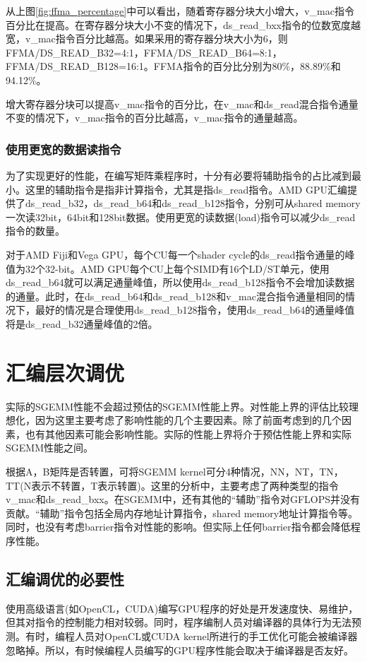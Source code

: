 从上图\ref{fig:ffma_percentage}中可以看出，随着寄存器分块大小增大，v\_mac指令百分比在提高。在寄存器分块大小不变的情况下，ds\_read\_bxx指令的位数宽度越宽，v\_mac指令百分比越高。如果采用的寄存器分块大小为6，则FFMA/DS\_READ\_B32=4:1，FFMA/DS\_READ\_B64=8:1，FFMA/DS\_READ\_B128=16:1。FFMA指令的百分比分别为80\%，88.89\%和94.12\%。

增大寄存器分块可以提高v\_mac指令的百分比，在v\_mac和ds\_read混合指令通量不变的情况下，v\_mac指令的百分比越高，v\_mac指令的通量越高。

\subsubsection{使用更宽的数据读指令}
为了实现更好的性能，在编写矩阵乘程序时，十分有必要将辅助指令的占比减到最小。这里的辅助指令是指非计算指令，尤其是指ds\_read指令。AMD GPU汇编提供了ds\_read\_b32，ds\_read\_b64和ds\_read\_b128指令，分别可从shared memory一次读32bit，64bit和128bit数据。使用更宽的读数据(load)指令可以减少ds\_read指令的数量。

对于AMD Fiji和Vega GPU，每个CU每一个shader cycle的ds\_read指令通量的峰值为32个32-bit。AMD GPU每个CU上每个SIMD有16个LD/ST单元，使用ds\_read\_b64就可以满足通量峰值，所以使用ds\_read\_b128指令不会增加读数据的通量。此时，在ds\_read\_b64和ds\_read\_b128和v\_mac混合指令通量相同的情况下，最好的情况是合理使用ds\_read\_b128指令，使用ds\_read\_b64的通量峰值将是ds\_read\_b32通量峰值的2倍。


\section{汇编层次调优}
实际的SGEMM性能不会超过预估的SGEMM性能上界。对性能上界的评估比较理想化，因为这里主要考虑了影响性能的几个主要因素。除了前面考虑到的几个因素，也有其他因素可能会影响性能。实际的性能上界将介于预估性能上界和实际SGEMM性能之间。

根据A，B矩阵是否转置，可将SGEMM kernel可分4种情况，NN，NT，TN，TT(N表示不转置，T表示转置)。这里的分析中，主要考虑了两种类型的指令v\_mac和ds\_read\_bxx。在SGEMM中，还有其他的“辅助”指令对GFLOPS并没有贡献。“辅助”指令包括全局内存地址计算指令，shared memory地址计算指令等。同时，也没有考虑barrier指令对性能的影响。但实际上任何barrier指令都会降低程序性能。

\subsection{汇编调优的必要性}
使用高级语言(如OpenCL，CUDA)编写GPU程序的好处是开发速度快、易维护，但其对指令的控制能力相对较弱。同时，程序编制人员对编译器的具体行为无法预测。有时，编程人员对OpenCL或CUDA kernel所进行的手工优化可能会被编译器忽略掉。所以，有时候编程人员编写的GPU程序性能会取决于编译器是否友好。

